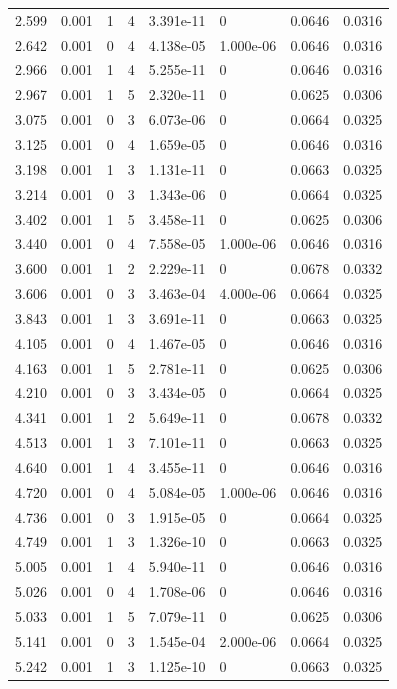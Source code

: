 \documentclass[preview]{standalone}
\begin{document}
{{\begin{tabular}{L{1.2cm}C{1.2cm} C{0.3cm}C{0.5cm} C{1.4cm}C{1.4cm} C{1.4cm}C{1.4cm}}
  2.599  &  0.001  & 1     &  4 &  3.391e-11  & 0  & 0.0646 &  0.0316   \\ 
  2.642  &  0.001  & 0     &  4 &  4.138e-05  & 1.000e-06  & 0.0646 &  0.0316   \\ 
  2.966  &  0.001  & 1     &  4 &  5.255e-11  & 0  & 0.0646 &  0.0316   \\ 
  2.967  &  0.001  & 1     &  5 &  2.320e-11  & 0  & 0.0625 &  0.0306   \\ 
  3.075  &  0.001  & 0     &  3 &  6.073e-06  & 0  & 0.0664 &  0.0325   \\ 
  3.125  &  0.001  & 0     &  4 &  1.659e-05  & 0  & 0.0646 &  0.0316   \\ 
  3.198  &  0.001  & 1     &  3 &  1.131e-11  & 0  & 0.0663 &  0.0325   \\ 
  3.214  &  0.001  & 0     &  3 &  1.343e-06  & 0  & 0.0664 &  0.0325   \\ 
  3.402  &  0.001  & 1     &  5 &  3.458e-11  & 0  & 0.0625 &  0.0306   \\ 
  3.440  &  0.001  & 0     &  4 &  7.558e-05  & 1.000e-06  & 0.0646 &  0.0316   \\ 
  3.600  &  0.001  & 1     &  2 &  2.229e-11  & 0  & 0.0678 &  0.0332   \\ 
  3.606  &  0.001  & 0     &  3 &  3.463e-04  & 4.000e-06  & 0.0664 &  0.0325   \\ 
  3.843  &  0.001  & 1     &  3 &  3.691e-11  & 0  & 0.0663 &  0.0325   \\ 
  4.105  &  0.001  & 0     &  4 &  1.467e-05  & 0  & 0.0646 &  0.0316   \\ 
  4.163  &  0.001  & 1     &  5 &  2.781e-11  & 0  & 0.0625 &  0.0306   \\ 
  4.210  &  0.001  & 0     &  3 &  3.434e-05  & 0  & 0.0664 &  0.0325   \\ 
  4.341  &  0.001  & 1     &  2 &  5.649e-11  & 0  & 0.0678 &  0.0332   \\ 
  4.513  &  0.001  & 1     &  3 &  7.101e-11  & 0  & 0.0663 &  0.0325   \\ 
  4.640  &  0.001  & 1     &  4 &  3.455e-11  & 0  & 0.0646 &  0.0316   \\ 
  4.720  &  0.001  & 0     &  4 &  5.084e-05  & 1.000e-06  & 0.0646 &  0.0316   \\ 
  4.736  &  0.001  & 0     &  3 &  1.915e-05  & 0  & 0.0664 &  0.0325   \\ 
  4.749  &  0.001  & 1     &  3 &  1.326e-10  & 0  & 0.0663 &  0.0325   \\ 
  5.005  &  0.001  & 1     &  4 &  5.940e-11  & 0  & 0.0646 &  0.0316   \\ 
  5.026  &  0.001  & 0     &  4 &  1.708e-06  & 0  & 0.0646 &  0.0316   \\ 
  5.033  &  0.001  & 1     &  5 &  7.079e-11  & 0  & 0.0625 &  0.0306   \\ 
  5.141  &  0.001  & 0     &  3 &  1.545e-04  & 2.000e-06  & 0.0664 &  0.0325   \\ 
  5.242  &  0.001  & 1     &  3 &  1.125e-10  & 0  & 0.0663 &  0.0325   \\ 
\hline 
\end{tabular} 

}}
\end{document}

